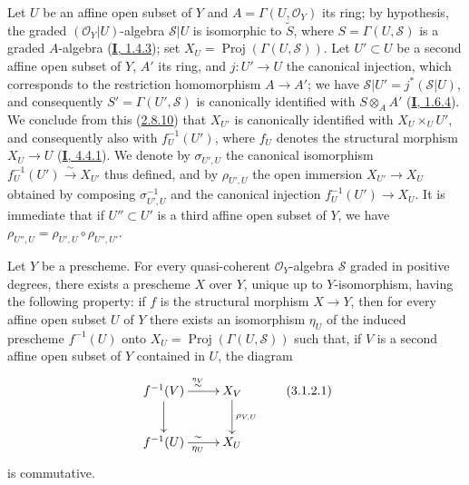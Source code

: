 \begin{env}[3.1.1]
Let $U$ be an affine open subset of $Y$ and $A=\Gamma(U,\mathcal{O}_Y)$ its
ring; by hypothesis, the graded $(\mathcal{O}_Y|U)$-algebra $\mathcal{S}|U$
is isomorphic to $\widetilde{S}$, where $S=\Gamma(U,\mathcal{S})$ is a graded
$A$-algebra
(\hyperref[I.1.4.3]{\textbf{I}, 1.4.3}); set
$X_U=\operatorname{Proj}(\Gamma(U,\mathcal{S}))$. Let $U'\subset U$ be a
second affine open subset of $Y$, $A'$ its ring, and $j:U'\to U$ the
canonical injection, which corresponds to the restriction homomorphism
$A\to A'$; we have $\mathcal{S}|U'=j^*(\mathcal{S}|U)$, and consequently
$S'=\Gamma(U',\mathcal{S})$ is canonically identified with $S\otimes_A A'$
(\hyperref[I.1.6.4]{\textbf{I}, 1.6.4}). We conclude from this
(\hyperref[II.2.8.10]{2.8.10}) that $X_{U'}$ is canonically identified
with $X_U\times_U U'$, and consequently also with $f_U^{-1}(U')$, where $f_U$
denotes the structural morphism $X_U\to U$
(\hyperref[I.4.4.1]{\textbf{I}, 4.4.1}). We denote by $\sigma_{U',U}$ the
canonical isomorphism $f_U^{-1}(U')\xrightarrow{\sim}X_{U'}$ thus defined,
and by $\rho_{U',U}$ the open immersion $X_{U'}\to X_U$ obtained by composing
$\sigma_{U',U}^{-1}$ and the canonical injection $f_U^{-1}(U')\to X_U$. It is
immediate that if $U''\subset U'$ is a third affine open subset of $Y$, we
have $\rho_{U'',U}=\rho_{U',U}\circ\rho_{U'',U'}$.
\end{env}

\begin{proposition}[3.1.2]
\label{II.3.1.2}
Let $Y$ be a prescheme. For every quasi-coherent $\mathcal{O}_Y$-algebra
$\mathcal{S}$ graded in positive degrees, there exists a prescheme $X$ over
$Y$, unique up to $Y$-isomorphism, having the following property: if $f$ is
the structural morphism $X\to Y$, then for every affine open subset $U$ of
$Y$ there exists an isomorphism $\eta_U$ of the induced prescheme
$f^{-1}(U)$ onto $X_U=\operatorname{Proj}(\Gamma(U,\mathcal{S}))$ such that,
if $V$ is a second affine open subset of $Y$ contained in $U$, the diagram
\[
\label{II.3.1.2.1}
  \xymatrix{
    f^{-1}(V)\ar[r]^{\overset{\eta_V}{\sim}}\ar[d]
    & X_V\ar[d]^{\rho_{V,U}}\\
    f^{-1}(U)\ar[r]^{\sim}_{\eta_U}
    & X_U
  }
\tag{3.1.2.1}
\]
is commutative.
\end{proposition}

